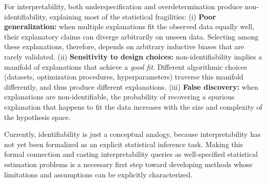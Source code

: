 For interpretability, both underspecification and overdetermination produce non-identifiability, explaining most of the statistical fragilities:
(i) \textbf{Poor generalization:} when multiple explanations fit the observed data equally well, their explanatory claims can diverge arbitrarily on unseen data. Selecting among these explanations, therefore, depends on arbitrary inductive biases that are rarely validated.
(ii) \textbf{Sensitivity to design choices:} non-identifiability implies a manifold of explanations that achieve a \textit{good fit}. Different algorithmic choices (datasets, optimization procedures, hyperparameters) traverse this manifold differently, and thus produce different explanations.
(iii) \textbf{False discovery:} when explanations are non-identifiable, the probability of recovering a spurious explanation that happens to fit the data increases with the size and complexity of the hypothesis space.

Currently, identifiability is just a conceptual analogy, because interpretability has not yet been formalized as an explicit statistical inference task. Making this formal connection and casting interpretability queries as well-specified statistical estimation problems is a necessary first step toward developing methods whose limitations and assumptions can be explicitly characterized.